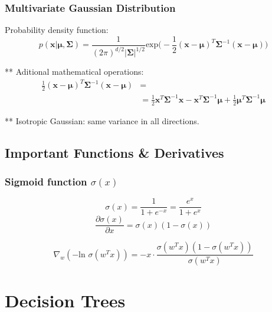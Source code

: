 \documentclass[a4paper,10pt,twoside=true,DIV=10,headsepline,plainheadsepline]{scrartcl}
\begin{document}
			\subsubsection{Multivariate Gaussian Distribution}

				Probability density function: 
					\begin{equation}
						p(\mathbf{x} | \mathbf{\mu}, \mathbf{\Sigma}) = \frac{1}{(2\pi)^{d/2} | \mathbf{\Sigma} |^{1/2}} \textrm{exp}\bigg(- \frac{1}{2} (\mathbf{x} - \mathbf{\mu})^T \mathbf{\Sigma}^{-1} (\mathbf{x} - \mathbf{\mu}) \bigg)
					\end{equation}

				** Aditional mathematical operations:
					\begin{align}
						\frac{1}{2} (\mathbf{x} - \mathbf{\mu})^T \mathbf{\Sigma}^{-1} (\mathbf{x} - \mathbf{\mu}) &= \\
						 &= \frac{1}{2} \mathbf{x}^T \mathbf{\Sigma}^{-1} \mathbf{x} -  \mathbf{x}^T \mathbf{\Sigma}^{-1} \mathbf{\mu} + \frac{1}{2} \mathbf{\mu}^T \mathbf{\Sigma}^{-1} \mathbf{\mu}
					\end{align}

			
			** Isotropic Gaussian: same variance in all directions.
					
				
		\subsection{Important Functions \& Derivatives}
		\subsubsection{Sigmoid function $\sigma(x)$}
			\begin{equation}
				\sigma(x) = \frac{1}{1+e^{-x}} = \frac{e^{x}}{1+e^{x}}
			\end{equation}
			\begin{equation}
				\frac{\partial \sigma(x)}{\partial x} = \sigma(x)(1 - \sigma(x))
			\end{equation}
			
			\begin{equation}
				\nabla_w (- \textrm{ln }\sigma(w^T x)) = -x \cdot \frac{\sigma(w^T x)(1 - \sigma(w^T x))}{\sigma(w^T x)}
			\end{equation}
			

	\section{Decision Trees}
\end{document}
